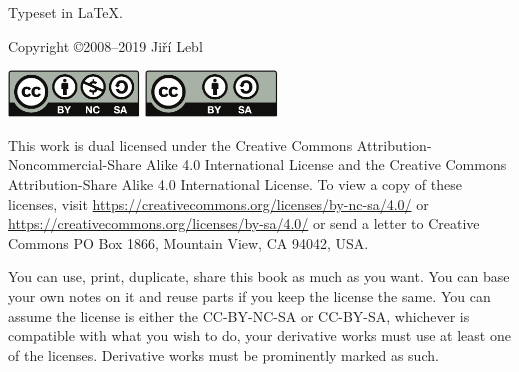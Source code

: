 \documentclass[12pt]{book}
\begin{document}

\newcommand{\theversion}{6.0}
\makediffytitlepage

\newpage

\vspace*{\fill}

\begin{small}
\noindent
Typeset in \LaTeX.

\bigskip

\noindent
Copyright \copyright 2008--2019 Ji\v{r}\'i Lebl



\bigskip

\noindent
\includegraphics[width=1.38in]{figures/license}
\quad
\includegraphics[width=1.38in]{figures/license2}

\bigskip

\noindent
This work
is dual licensed under
the Creative Commons
Attribution-Non\-commercial-Share Alike 4.0 International License and
the Creative Commons
Attribution-Share Alike 4.0 International License.
To view a
copy of these licenses, visit
\url{https://creativecommons.org/licenses/by-nc-sa/4.0/}
or
\url{https://creativecommons.org/licenses/by-sa/4.0/}
or send a letter to
Creative Commons
PO Box 1866, Mountain View, CA 94042, USA\@.

\bigskip

\noindent
You can use, print, duplicate, share this book as much as you want.  You can
base your own notes on it and reuse parts if you keep the license the
same.  You can assume the license is either the
CC-BY-NC-SA or CC-BY-SA\@,
whichever is compatible with what you wish to do, your derivative works must
use at least one of the licenses.
Derivative works must be prominently marked as such.


\end{small}
\end{document}
